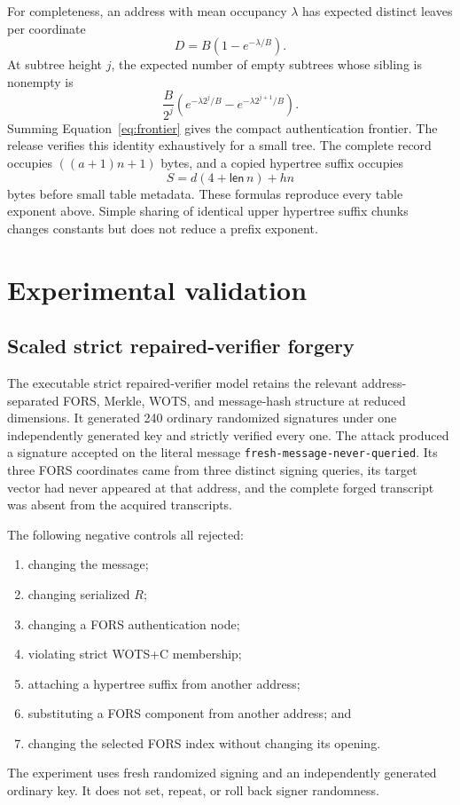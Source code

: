 \documentclass[11pt,a4paper]{article}
\begin{document}
For completeness, an address with mean occupancy $\lambda$ has expected
distinct leaves per coordinate
\begin{equation}
 D=B(1-e^{-\lambda/B}).                                  \label{eq:distinct}
\end{equation}
At subtree height $j$, the expected number of empty subtrees whose sibling is
nonempty is
\begin{equation}
 \frac{B}{2^j}\left(e^{-\lambda2^j/B}
                    -e^{-\lambda2^{j+1}/B}\right).       \label{eq:frontier}
\end{equation}
Summing Equation~\eqref{eq:frontier} gives the compact authentication
frontier.  The release verifies this identity exhaustively for a small tree.
The complete record occupies $((a+1)n+1)$ bytes, and a copied hypertree suffix
occupies
\begin{equation}
 S=d(4+\mathsf{len}\,n)+hn                         \label{eq:suffix}
\end{equation}
bytes before small table metadata.  These formulas reproduce every table
exponent above.  Simple sharing of identical upper hypertree suffix chunks
changes constants but does not reduce a prefix exponent.

\section{Experimental validation}

\subsection{Scaled strict repaired-verifier forgery}

The executable strict repaired-verifier model retains the relevant
address-separated FORS,
Merkle, WOTS, and message-hash structure at reduced dimensions.  It generated
240 ordinary randomized signatures under one independently generated key and
strictly verified every one.  The attack produced a signature accepted on the
literal message \texttt{fresh-message-never-queried}.  Its three FORS
coordinates came from three distinct signing queries, its target vector had
never appeared at that address, and the complete forged transcript was absent
from the acquired transcripts.

The following negative controls all rejected:
\begin{enumerate}[leftmargin=*,itemsep=2pt]
  \item changing the message;
  \item changing serialized $R$;
  \item changing a FORS authentication node;
  \item violating strict WOTS+C membership;
  \item attaching a hypertree suffix from another address;
  \item substituting a FORS component from another address; and
  \item changing the selected FORS index without changing its opening.
\end{enumerate}
The experiment uses fresh randomized signing and an independently generated
ordinary key.  It does not set, repeat, or roll back signer randomness.
\end{document}
